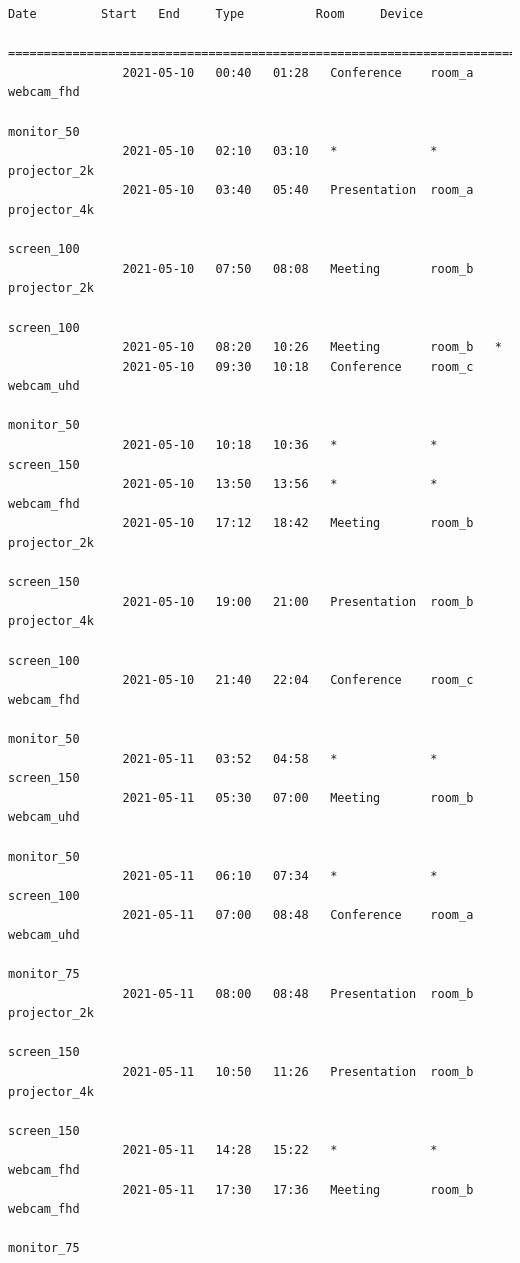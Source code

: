\documentclass{article}
\begin{document}
\begin{Verbatim}[gobble=8]
                Date         Start   End     Type          Room     Device
                ===========================================================================
                2021-05-10   00:40   01:28   Conference    room_a   webcam_fhd
                                                                    monitor_50
                2021-05-10   02:10   03:10   *             *        projector_2k
                2021-05-10   03:40   05:40   Presentation  room_a   projector_4k
                                                                    screen_100
                2021-05-10   07:50   08:08   Meeting       room_b   projector_2k
                                                                    screen_100
                2021-05-10   08:20   10:26   Meeting       room_b   *
                2021-05-10   09:30   10:18   Conference    room_c   webcam_uhd
                                                                    monitor_50
                2021-05-10   10:18   10:36   *             *        screen_150
                2021-05-10   13:50   13:56   *             *        webcam_fhd
                2021-05-10   17:12   18:42   Meeting       room_b   projector_2k
                                                                    screen_150
                2021-05-10   19:00   21:00   Presentation  room_b   projector_4k
                                                                    screen_100
                2021-05-10   21:40   22:04   Conference    room_c   webcam_fhd
                                                                    monitor_50
                2021-05-11   03:52   04:58   *             *        screen_150
                2021-05-11   05:30   07:00   Meeting       room_b   webcam_uhd
                                                                    monitor_50
                2021-05-11   06:10   07:34   *             *        screen_100
                2021-05-11   07:00   08:48   Conference    room_a   webcam_uhd
                                                                    monitor_75
                2021-05-11   08:00   08:48   Presentation  room_b   projector_2k
                                                                    screen_150
                2021-05-11   10:50   11:26   Presentation  room_b   projector_4k
                                                                    screen_150
                2021-05-11   14:28   15:22   *             *        webcam_fhd
                2021-05-11   17:30   17:36   Meeting       room_b   webcam_fhd
                                                                    monitor_75

\end{Verbatim}
\end{document}
